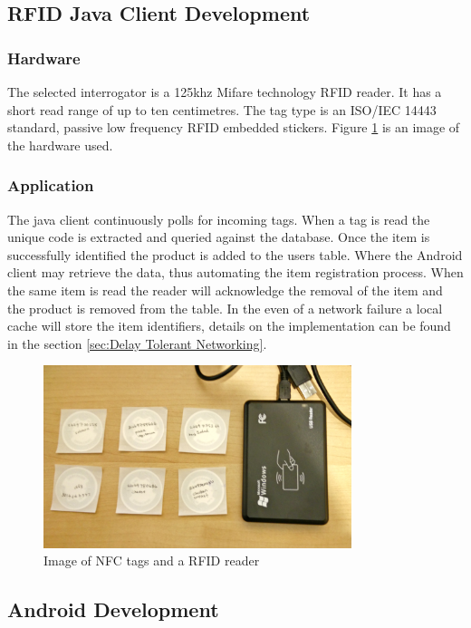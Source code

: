 \documentclass[a4paper, 11pt]{article}
\begin{document}
\subsection{RFID Java Client Development}
\subsubsection{Hardware}The selected interrogator is a 125khz Mifare technology RFID reader. It has a short read range of up to ten centimetres. The tag type is an ISO/IEC 14443 standard, passive low frequency RFID embedded stickers. Figure \ref{fig:RFID} is an image of the hardware used. 


\subsubsection{Application} 
The java client continuously polls for incoming tags. When a tag is read the unique code is extracted and queried against the database. Once the item is successfully identified the product is added to the users table. Where the Android client may retrieve the data, thus automating the item registration process. When the same item is read the reader will acknowledge the removal of the item and the product is removed from the table.
In the even of a network failure a local cache will store the item identifiers, details on the implementation can be found in the section \ref{sec:Delay Tolerant Networking}.

\vspace{\baselineskip}

\begin{figure}[!hp]
\centering
\includegraphics[width=9cm]{rfid}
\caption{Image of NFC tags and a RFID reader} \label{fig:RFID}
\end{figure}

\vspace{\baselineskip}

\subsection{Android Development} 
\end{document}
